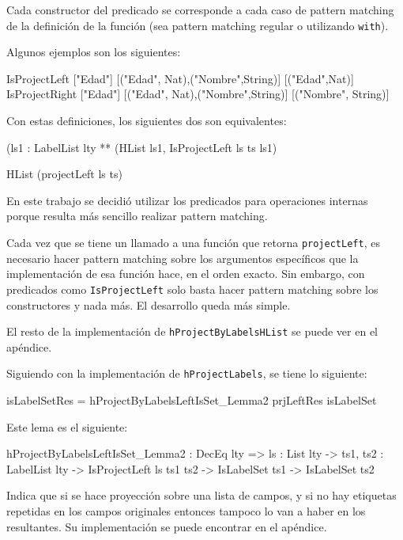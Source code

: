 Cada constructor del predicado se corresponde a cada caso de pattern matching de la definición de la función (sea pattern matching regular o utilizando \texttt{with}).

Algunos ejemplos son los siguientes:

\begin{code}
IsProjectLeft ["Edad"] [("Edad", Nat),("Nombre",String)] 
  [("Edad",Nat)]
IsProjectRight ["Edad"] [("Edad", Nat),("Nombre",String)]
  [("Nombre", String)] 
\end{code}

Con estas definiciones, los siguientes dos son equivalentes:

\begin{code}
(ls1 : LabelList lty ** (HList ls1, IsProjectLeft ls ts ls1)

HList (projectLeft ls ts)
\end{code}

En este trabajo se decidió utilizar los predicados para operaciones internas porque resulta más sencillo realizar pattern matching. 

Cada vez que se tiene un llamado a una función que retorna \texttt{projectLeft}, es necesario hacer pattern matching sobre los argumentos específicos que la implementación de esa función hace, en el orden exacto. Sin embargo, con predicados como \texttt{IsProjectLeft} solo basta hacer pattern matching sobre los constructores y nada más. El desarrollo queda más simple.

El resto de la implementación de \texttt{hProjectByLabelsHList} se puede ver en el apéndice.

Siguiendo con la implementación de \texttt{hProjectLabels}, se tiene lo siguiente:

\begin{code}
isLabelSetRes = 
  hProjectByLabelsLeftIsSet_Lemma2 prjLeftRes isLabelSet
\end{code}

Este lema es el siguiente:

\begin{code}
hProjectByLabelsLeftIsSet_Lemma2 : DecEq lty => {ls : List lty} -> 
  {ts1, ts2 : LabelList lty} -> IsProjectLeft ls ts1 ts2 -> 
  IsLabelSet ts1 -> IsLabelSet ts2
\end{code}

Indica que si se hace proyección sobre una lista de campos, y si no hay etiquetas repetidas en los campos originales entonces tampoco lo van a haber en los resultantes. Su implementación se puede encontrar en el apéndice.

